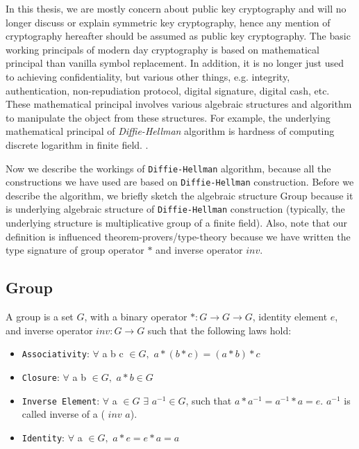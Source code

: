    
    
    In this thesis, we are mostly concern about public key cryptography and will no longer discuss or explain 
    symmetric key cryptography, hence any mention of cryptography hereafter should be assumed as
    public key cryptography. 
    The basic working principals of modern day cryptography is based on 
    mathematical principal than vanilla symbol replacement. 
    In addition, it is no longer just 
    used to achieving confidentiality, but various other things, e.g. integrity,  authentication, non-repudiation 
    protocol, digital signature, digital cash, etc.
    These mathematical principal involves 
    various algebraic structures and algorithm to manipulate the object from these structures.
    For example, the underlying mathematical principal of \textit{Diffie-Hellman}  algorithm 
    is hardness of computing discrete logarithm in finite field. .
    
    
    
  
    
    Now we  describe the workings of \texttt{Diffie-Hellman} \citep{Diffie:2006:NDC:2263321.2269104}
    algorithm, because all the constructions we have used  are based on \texttt{Diffie-Hellman} construction. 
    Before we describe the algorithm, we briefly sketch the algebraic structure Group because it is underlying algebraic structure of 
    \texttt{Diffie-Hellman}  construction  (typically, the underlying 
    structure is multiplicative group of a finite field). Also, note that our definition is influenced theorem-provers/type-theory because 
    we have  written the type signature of group operator $*$ and inverse operator $inv$. 
    
    \subsection{Group}
    \label{sec:group}
    A group is a set $G$, with a binary operator $* : G \rightarrow G \rightarrow G$, identity element $e$, and inverse operator $inv : G \rightarrow G$ such 
    that the following laws hold: 
    \begin{itemize}
     \item \texttt{Associativity}: $\forall$  a b c $\in G,$  $a * (b * c) = (a * b) * c$
    \item \texttt{Closure}: $\forall$ a b $\in G,$  $a * b \in G$
    \item \texttt{Inverse Element}: $\forall$ a $\in G$ $\exists$ $a^{-1} \in G$, such that $a * a^{-1} = a^{-1} * a = e$. $a^{-1}$ is called inverse of a (
     $inv$ $a$).
    \item \texttt{Identity}: $\forall$ a $\in G,$  $a * e = e * a  = a$
    \end{itemize}
   
